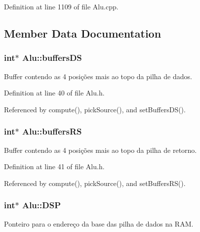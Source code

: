 Definition at line 1109 of file Alu.\+cpp.



\subsection{Member Data Documentation}
\hypertarget{classAlu_a259ee7ef49be47158d26c8c3a0ae1feb}{
\subsubsection[{buffers\+D\+S}]{\setlength{\rightskip}{0pt plus 5cm}int$\ast$ Alu\+::buffers\+D\+S\hspace{0.3cm}{\ttfamily [private]}}}\label{classAlu_a259ee7ef49be47158d26c8c3a0ae1feb}
Buffer contendo as 4 posições mais ao topo da pilha de dados. 

Definition at line 40 of file Alu.\+h.



Referenced by compute(), pick\+Source(), and set\+Buffers\+D\+S().

\hypertarget{classAlu_a4b54db20f10aed5d7d70378b5c9a77fd}{
\subsubsection[{buffers\+R\+S}]{\setlength{\rightskip}{0pt plus 5cm}int$\ast$ Alu\+::buffers\+R\+S\hspace{0.3cm}{\ttfamily [private]}}}\label{classAlu_a4b54db20f10aed5d7d70378b5c9a77fd}
Buffer contendo as 4 posições mais ao topo da pilha de retorno. 

Definition at line 41 of file Alu.\+h.



Referenced by compute(), pick\+Source(), and set\+Buffers\+R\+S().

\hypertarget{classAlu_aea20506a48d2027cd27a0c2aec32a4c7}{
\subsubsection[{D\+S\+P}]{\setlength{\rightskip}{0pt plus 5cm}int$\ast$ Alu\+::\+D\+S\+P\hspace{0.3cm}{\ttfamily [private]}}}\label{classAlu_aea20506a48d2027cd27a0c2aec32a4c7}
Ponteiro para o endereço da base das pilha de dados na R\+A\+M. 

